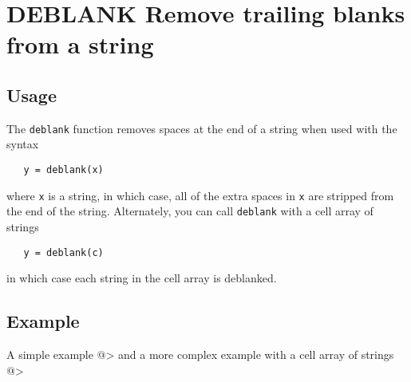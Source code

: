 \section{DEBLANK Remove trailing blanks from a string}

\subsection{Usage}

The \verb|deblank| function removes spaces at the end of a string
when used with the syntax
\begin{verbatim}
   y = deblank(x)
\end{verbatim}
where \verb|x| is a string, in which case, all of the extra spaces
in \verb|x| are stripped from the end of the string.  Alternately,
you can call \verb|deblank| with a cell array of strings
\begin{verbatim}
   y = deblank(c)
\end{verbatim}
in which case each string in the cell array is deblanked.
\subsection{Example}

A simple example
@>
and a more complex example with a cell array of strings
@>
